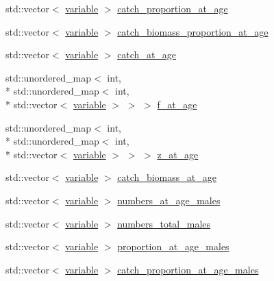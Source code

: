 \begin{DoxyCompactItemize}
\item 
std\-::vector$<$ \hyperlink{structmas_1_1_fleet_a1902d0842cb7ce9b9bdd4be013e709a9}{variable} $>$ \hyperlink{structmas_1_1_fleet_ad4ec4a206dbb1af192c85ae7ab0929ea}{catch\-\_\-proportion\-\_\-at\-\_\-age}
\item 
std\-::vector$<$ \hyperlink{structmas_1_1_fleet_a1902d0842cb7ce9b9bdd4be013e709a9}{variable} $>$ \hyperlink{structmas_1_1_fleet_ab29452b064132572243fbbb6ce7e8c06}{catch\-\_\-biomass\-\_\-proportion\-\_\-at\-\_\-age}
\item 
std\-::vector$<$ \hyperlink{structmas_1_1_fleet_a1902d0842cb7ce9b9bdd4be013e709a9}{variable} $>$ \hyperlink{structmas_1_1_fleet_a2a423b2624e36ff6ff786b4bea5db2fe}{catch\-\_\-at\-\_\-age}
\item 
std\-::unordered\-\_\-map$<$ int, \\*
std\-::unordered\-\_\-map$<$ int, \\*
std\-::vector$<$ \hyperlink{structmas_1_1_fleet_a1902d0842cb7ce9b9bdd4be013e709a9}{variable} $>$ $>$ $>$ \hyperlink{structmas_1_1_fleet_a5a9769854c2272ced6396dc091b3e318}{f\-\_\-at\-\_\-age}
\item 
std\-::unordered\-\_\-map$<$ int, \\*
std\-::unordered\-\_\-map$<$ int, \\*
std\-::vector$<$ \hyperlink{structmas_1_1_fleet_a1902d0842cb7ce9b9bdd4be013e709a9}{variable} $>$ $>$ $>$ \hyperlink{structmas_1_1_fleet_a0bd290f2fba5bd5f00a1666673d77a3b}{z\-\_\-at\-\_\-age}
\item 
std\-::vector$<$ \hyperlink{structmas_1_1_fleet_a1902d0842cb7ce9b9bdd4be013e709a9}{variable} $>$ \hyperlink{structmas_1_1_fleet_a6bcc185d0581e22288665272df90d8a0}{catch\-\_\-biomass\-\_\-at\-\_\-age}
\item 
std\-::vector$<$ \hyperlink{structmas_1_1_fleet_a1902d0842cb7ce9b9bdd4be013e709a9}{variable} $>$ \hyperlink{structmas_1_1_fleet_aa4aa9e9a3d34fc15d15543ae02aea2bd}{numbers\-\_\-at\-\_\-age\-\_\-males}
\item 
std\-::vector$<$ \hyperlink{structmas_1_1_fleet_a1902d0842cb7ce9b9bdd4be013e709a9}{variable} $>$ \hyperlink{structmas_1_1_fleet_a40064758c90639b12944f9ef12aeaf01}{numbers\-\_\-total\-\_\-males}
\item 
std\-::vector$<$ \hyperlink{structmas_1_1_fleet_a1902d0842cb7ce9b9bdd4be013e709a9}{variable} $>$ \hyperlink{structmas_1_1_fleet_a8a3bf314e6f6249f84fdaded007a0067}{proportion\-\_\-at\-\_\-age\-\_\-males}
\item 
std\-::vector$<$ \hyperlink{structmas_1_1_fleet_a1902d0842cb7ce9b9bdd4be013e709a9}{variable} $>$ \hyperlink{structmas_1_1_fleet_a03a9617218d69139a286073025084dbd}{catch\-\_\-proportion\-\_\-at\-\_\-age\-\_\-males}

\end{DoxyCompactItemize}
